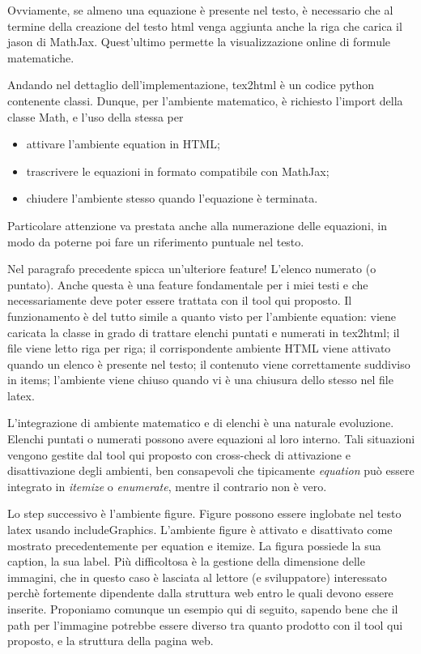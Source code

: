 Ovviamente, se almeno una equazione è presente nel testo, è necessario che al termine della creazione del testo html venga aggiunta anche la riga che carica il jason di MathJax. Quest'ultimo permette la visualizzazione online di formule matematiche. 

Andando nel dettaglio dell'implementazione, tex2html è un codice python contenente classi.
Dunque, per l'ambiente matematico, è richiesto l'import della classe Math, e l'uso della stessa per
\begin{itemize}
\item attivare l'ambiente equation in HTML; 
\item trascrivere le equazioni in formato compatibile con MathJax; 
\item chiudere l'ambiente stesso quando l'equazione è terminata. 
\end{itemize}

Particolare attenzione va prestata anche alla numerazione delle equazioni, in modo da poterne poi fare un riferimento puntuale nel testo. 

Nel paragrafo precedente spicca un'ulteriore feature! L'elenco numerato (o puntato). Anche questa è una feature fondamentale per i miei testi e che necessariamente deve poter essere trattata con il tool qui proposto. Il funzionamento è del tutto simile a quanto visto per l'ambiente equation: viene caricata la classe in grado di trattare elenchi puntati e numerati in tex2html; il file viene letto riga per riga; il corrispondente ambiente HTML viene attivato quando un elenco è presente nel testo; il contenuto viene correttamente suddiviso in items; l'ambiente viene chiuso quando vi è una chiusura dello stesso nel file latex. 

L'integrazione di ambiente matematico e di elenchi è una naturale evoluzione. Elenchi puntati o numerati possono avere equazioni al loro interno. Tali situazioni vengono gestite dal tool qui proposto con cross-check di attivazione e disattivazione degli ambienti, ben consapevoli che tipicamente \textit{equation} può essere integrato in \textit{itemize} o \textit{enumerate}, mentre il contrario non è vero.

Lo step successivo è l'ambiente figure. Figure possono essere inglobate nel testo latex usando includeGraphics. L'ambiente figure è attivato e disattivato come mostrato precedentemente per equation e itemize. La figura possiede la sua caption, la sua label. Più difficoltosa è la gestione della dimensione delle immagini, che in questo caso è lasciata al lettore (e sviluppatore) interessato perchè fortemente dipendente dalla struttura web entro le quali devono essere inserite. Proponiamo comunque un esempio qui di seguito, sapendo bene che il path per l'immagine potrebbe essere diverso tra quanto prodotto con il tool qui proposto, e la struttura della pagina web. 

